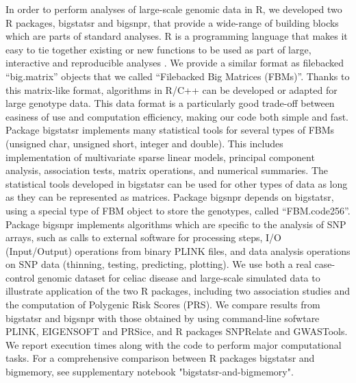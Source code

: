 \documentclass{bioinfo}
\begin{document}
{\color{red}
In order to perform analyses of large-scale genomic data in R, we developed two R packages, bigstatsr and bigsnpr, that provide a wide-range of building blocks which are parts of standard analyses. 
R is a programming language that makes it easy to tie together existing or new functions to be used as part of large, interactive and reproducible analyses \cite[]{R2017}.
We provide a similar format as filebacked ``big.matrix'' objects that we called ``Filebacked Big Matrices (FBMs)''. Thanks to this matrix-like format, algorithms in R/C++ can be developed or adapted for large genotype data. This data format is a particularly good trade-off between easiness of use and computation efficiency, making our code both simple and fast.
}
Package bigstatsr implements many statistical tools for several types of FBMs (unsigned char, unsigned short, integer and double). This includes implementation of multivariate sparse linear models, principal component analysis, association tests, matrix operations, and numerical summaries. The statistical tools developed in bigstatsr can be used for other types of data as long as they can be represented as matrices. Package bigsnpr depends on bigstatsr, using a special type of FBM object to store the genotypes, called ``FBM.code256''. Package bigsnpr implements algorithms which are specific to the analysis of SNP arrays, such as calls to external software for processing steps, I/O (Input/Output) operations from binary PLINK files, and data analysis operations on SNP data (thinning, testing, predicting, plotting). 
{\color{red}
We use both a real case-control genomic dataset for celiac disease and large-scale simulated data to illustrate application of the two R packages, including two association studies and the computation of Polygenic Risk Scores (PRS). We compare results from bigstatsr and bigsnpr with those obtained by using command-line sofwtare PLINK, EIGENSOFT and PRSice, and R packages SNPRelate and GWASTools. We report execution times along with the code to perform major computational tasks. 
For a comprehensive comparison between R packages bigstatsr and bigmemory, see supplementary notebook "bigstatsr-and-bigmemory".
} 
\end{document}
